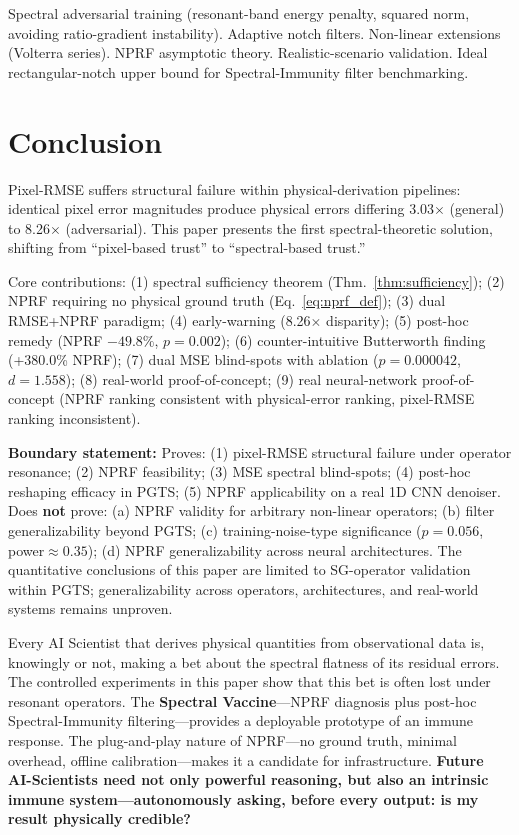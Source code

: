 \documentclass[9pt,twocolumn]{article}
\theoremstyle{remark}
\theoremstyle{definition}
\begin{document}
Spectral adversarial training (resonant-band energy penalty, squared norm, avoiding ratio-gradient instability). Adaptive notch filters. Non-linear extensions (Volterra series). NPRF asymptotic theory. Realistic-scenario validation. Ideal rectangular-notch upper bound for Spectral-Immunity filter benchmarking.

\section{Conclusion}

Pixel-RMSE suffers structural failure within physical-derivation pipelines: identical pixel error magnitudes produce physical errors differing 3.03$\times$ (general) to 8.26$\times$ (adversarial). This paper presents the first spectral-theoretic solution, shifting from ``pixel-based trust'' to ``spectral-based trust.''

Core contributions: (1) spectral sufficiency theorem (Thm.\ \ref{thm:sufficiency}); (2) NPRF requiring no physical ground truth (Eq.\ \ref{eq:nprf_def}); (3) dual RMSE+NPRF paradigm; (4) early-warning (8.26$\times$ disparity); (5) post-hoc remedy (NPRF $-49.8\%$, $p=0.002$); (6) counter-intuitive Butterworth finding (+380.0\% NPRF); (7) dual MSE blind-spots with ablation ($p=0.000042$, $d=1.558$); (8) real-world proof-of-concept; (9) real neural-network proof-of-concept (NPRF ranking consistent with physical-error ranking, pixel-RMSE ranking inconsistent).

\begingroup
\scriptsize
\textbf{Boundary statement:} Proves: (1) pixel-RMSE structural failure under operator resonance; (2) NPRF feasibility; (3) MSE spectral blind-spots; (4) post-hoc reshaping efficacy in PGTS; (5) NPRF applicability on a real 1D CNN denoiser. Does \textbf{not} prove: (a) NPRF validity for arbitrary non-linear operators; (b) filter generalizability beyond PGTS; (c) training-noise-type significance ($p=0.056$, power$\approx0.35$); (d) NPRF generalizability across neural architectures. The quantitative conclusions of this paper are limited to SG-operator validation within PGTS; generalizability across operators, architectures, and real-world systems remains unproven.
\endgroup

\vspace{0.3pt}

Every AI Scientist that derives physical quantities from observational data is, knowingly or not, making a bet about the spectral flatness of its residual errors. The controlled experiments in this paper show that this bet is often lost under resonant operators. The \textbf{Spectral Vaccine}---NPRF diagnosis plus post-hoc Spectral-Immunity filtering---provides a deployable prototype of an immune response. The plug-and-play nature of NPRF---no ground truth, minimal overhead, offline calibration---makes it a candidate for infrastructure. \textbf{Future AI-Scientists need not only powerful reasoning, but also an intrinsic immune system---autonomously asking, before every output: is my result physically credible?}
\end{document}
